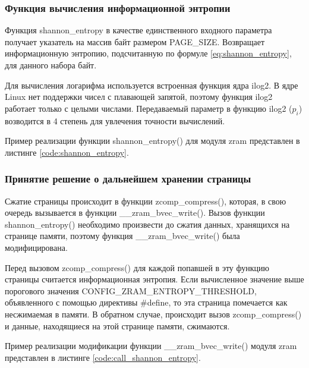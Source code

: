 \subsubsection{Функция вычисления информационной энтропии}

Функция shannon\_entropy в качестве единственного входного параметра получает указатель на массив байт размером PAGE\_SIZE. Возвращает информационную энтропию, подсчитанную по формуле \ref{eq:shannon_entropy}, для данного набора байт.

Для вычисления логарифма используется встроенная функция ядра ilog2. В ядре Linux нет поддержки чисел с плавающей запятой, поэтому функция ilog2 работает только с целыми числами. Передаваемый параметр в функцию ilog2 ($p_{i}$) возводится в 4 степень для увлечения точности вычислений.

Пример реализации функции shannon\_entropy() для модуля zram представлен в листинге \ref{code:shannon_entropy}.

\newpage


\subsubsection{Принятие решение о дальнейшем хранении страницы}

Сжатие страницы происходит в функции zcomp\_compress(), которая, в свою очередь вызывается в функции \_\_zram\_bvec\_write(). Вызов функции\\ shannon\_entropy() необходимо произвести до сжатия данных, хранящихся на странице памяти, поэтому функция \_\_zram\_bvec\_write() была модифицирована. 

Перед вызовом zcomp\_compress() для каждой попавшей в эту функцию страницы считается информационная энтропия. Если вычисленное значение выше порогового значения CONFIG\_ZRAM\_ENTROPY\_THRESHOLD, объявленного с помощью директивы \#define, то эта страница помечается как несжимаемая в памяти. В обратном случае, происходит вызов zcomp\_compress() и данные, находящиеся на этой странице памяти, сжимаются. 

Пример реализации модификации функции \_\_zram\_bvec\_write() модуля zram представлен в листинге \ref{code:call_shannon_entropy}.

